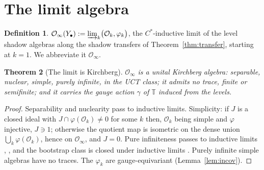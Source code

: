 \documentclass[11pt]{amsart}
\numberwithin{equation}{section}
\newtheorem{theorem}{Theorem}[section]
\theoremstyle{definition}
\newtheorem{definition}[theorem]{Definition}
\theoremstyle{remark}
\newcommand{\cO}{\mathcal{O}}
\begin{document}
\section{The limit algebra}\label{sec:limit}

\begin{definition}\label{def:limit}
$\cO_\infty(Y_\bullet):=\varinjlim_k\bigl(\cO_k,\varphi_k\bigr)$, the $C^*$-inductive limit
of the level shadow algebras along the shadow transfers of Theorem~\ref{thm:transfer},
starting at $k=1$. We abbreviate it $\cO_\infty$.
\end{definition}

\begin{theorem}[The limit is Kirchberg]\label{thm:kirchberg}
$\cO_\infty$ is a unital Kirchberg algebra: separable, nuclear, simple, purely infinite,
in the UCT class; it admits no trace, finite or semifinite; and it carries the gauge
action $\gamma$ of $\mathbb T$ induced from the levels.
\end{theorem}

\begin{proof}
Separability and nuclearity pass to inductive limits. Simplicity: if $J$ is a closed
ideal with $J\cap\varphi(\cO_k)\ne0$ for some $k$ then, $\cO_k$ being simple and
$\varphi$ injective, $J\ni1$; otherwise the quotient map is isometric on the dense union
$\bigcup_k\varphi(\cO_k)$, hence on $\cO_\infty$, and $J=0$. Pure infiniteness passes to
inductive limits \cite[\S4]{KR}, \cite[\S4.1]{Ro}, and the bootstrap class is closed
under inductive limits \cite{RS}. Purely infinite simple algebras have no traces. The
$\varphi_k$ are gauge-equivariant (Lemma~\ref{lem:incov}).
\end{proof}
\end{document}
